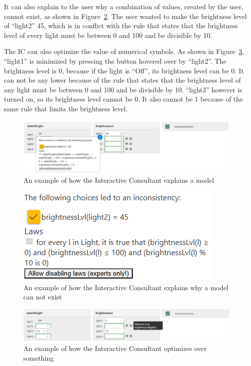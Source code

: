 \documentclass[11pt,a4paper]{report}
\begin{document}
It can also explain to the user why a combination of values, created by the user, cannot exist, as shown in Figure~\ref{fig:IDP-Z3_interactive-consultant_error-example}. The user wanted to make the brightness level of ``light2'' 45, which is in conflict with the rule that states that the brightness level of every light must be between 0 and 100 and be divisible by 10.

The IC can also optimize the value of numerical symbols. As shown in Figure~\ref{fig:IDP-Z3_interactive-consultant_optimization-example}, ``light1'' is minimized by pressing the button hovered over by ``light2''. The brightness level is 0, because if the light is ``Off'', its brightness level can be 0. It can not be any lower because of the rule that states that the brightness level of any light must be between 0 and 100 and be divisible by 10. ``light3'' however is turned on, so its brightness level cannot be 0. It also cannot be 1 because of the same rule that limits the brightness level.

\begin{figure}
    \centering
    \includegraphics[width=0.8\linewidth]{images/IDP-Z3_interactive-consultant_light-example.png}
    \caption{An example of how the Interactive Consultant explains a model}
    \label{fig:IDP-Z3_interactive-consultant_light-example}
\end{figure}

\begin{figure}
    \centering
    \includegraphics[width=0.4\linewidth]{images/IDP-Z3_interactive-consultant_error-example.png}
    \caption{An example of how the Interactive Consultant explains why a model can not exist}
    \label{fig:IDP-Z3_interactive-consultant_error-example}
\end{figure}

\begin{figure}
    \centering
    \includegraphics[width=0.8\linewidth]{images/IDP-Z3_interactive-consultant_optimization-example.png}
    \caption{An example of how the Interactive Consultant optimizes over something}
    \label{fig:IDP-Z3_interactive-consultant_optimization-example}
\end{figure}
\end{document}
